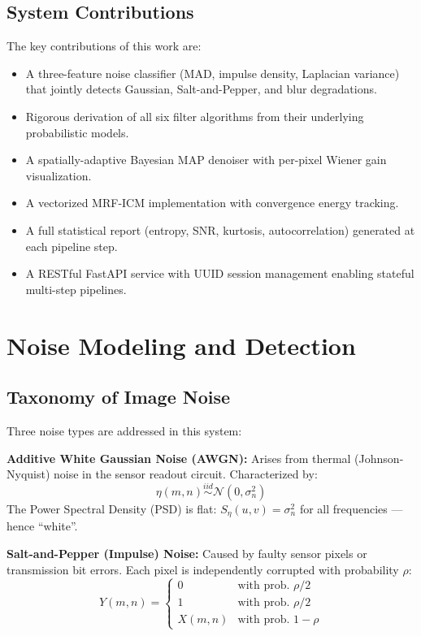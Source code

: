 \documentclass[10pt,conference]{IEEEtran}
\begin{document}
\subsection{System Contributions}
The key contributions of this work are:
\begin{itemize}
\item A three-feature noise classifier (MAD, impulse density, Laplacian variance) that jointly detects Gaussian, Salt-and-Pepper, and blur degradations.
\item Rigorous derivation of all six filter algorithms from their underlying probabilistic models.
\item A spatially-adaptive Bayesian MAP denoiser with per-pixel Wiener gain visualization.
\item A vectorized MRF-ICM implementation with convergence energy tracking.
\item A full statistical report (entropy, SNR, kurtosis, autocorrelation) generated at each pipeline step.
\item A RESTful FastAPI service with UUID session management enabling stateful multi-step pipelines.
\end{itemize}

\section{Noise Modeling and Detection}

\subsection{Taxonomy of Image Noise}
Three noise types are addressed in this system:

\textbf{Additive White Gaussian Noise (AWGN):} Arises from thermal (Johnson-Nyquist) noise in the sensor readout circuit. Characterized by:
\begin{equation}
\eta(m,n) \overset{iid}{\sim} \mathcal{N}(0,\sigma_n^2)
\end{equation}
The Power Spectral Density (PSD) is flat: $S_\eta(u,v) = \sigma_n^2$ for all frequencies --- hence ``white''.

\textbf{Salt-and-Pepper (Impulse) Noise:} Caused by faulty sensor pixels or transmission bit errors. Each pixel is independently corrupted with probability $\rho$:
\begin{equation}
Y(m,n) = \begin{cases} 0 & \text{with prob. } \rho/2 \\ 1 & \text{with prob. } \rho/2 \\ X(m,n) & \text{with prob. } 1-\rho \end{cases}
\end{equation}
\end{document}

